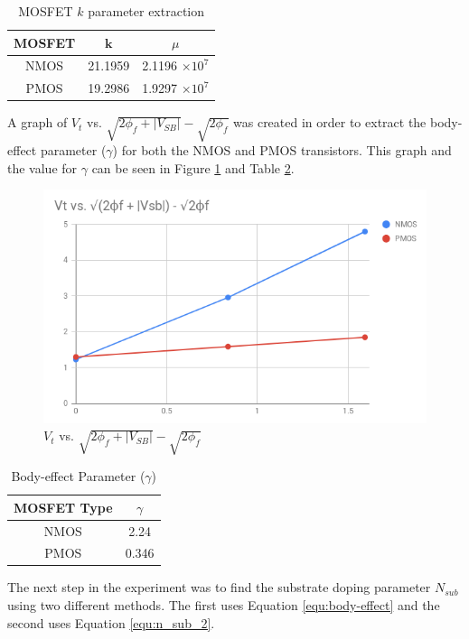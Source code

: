 \documentclass[11pt]{article}
\begin{document}
	\begin{table}[H]
		\centering
		\caption{MOSFET \(k\) parameter extraction}
		\label{table:experimental_body}
		\begin{tabular}{|c|c|c|}
			\hline
			\textbf{MOSFET} & \(\mathbf{k}\) & \(\mu\)\\
			\hline
			NMOS & 21.1959 & 2.1196 \(\times 10^{7}\)\\
			PMOS & 19.2986 & 1.9297 \(\times 10^{7}\)\\
			\hline
		\end{tabular}
	\end{table}
	
	A graph of \(V_t\) vs. \(\sqrt{2\phi_f + |V_{SB}|} - \sqrt{2\phi_f}\) was
	created in order to extract the body-effect parameter (\(\gamma\)) for both
	the NMOS and PMOS transistors. This graph and the value for \(\gamma\) can 
	be seen in Figure \ref{fig:body-effect} and Table \ref{table:body-effect}.

	\begin{figure}[H]
		\centering
		\includegraphics[width=4 in]{vt_vsb_body.png}
		\caption{\(V_t\) vs. \(\sqrt{2\phi_f + |V_{SB}|} - \sqrt{2\phi_f}\)}
		\label{fig:body-effect}
	\end{figure}

	\begin{table}[H]
		\centering
		\caption{Body-effect Parameter (\(\gamma\))}
		\label{table:body-effect}
		\begin{tabular}{|c|c|}
			\hline
			\textbf{MOSFET Type} & \(\gamma\)\\
			\hline
			NMOS & 2.24\\
			PMOS & 0.346\\
			\hline
		\end{tabular}
	\end{table}
	
	The next step in the experiment was to find the substrate doping parameter
	\(N_{sub}\) using two different methods. The first uses Equation
	\ref{equ:body-effect} and the second uses Equation \ref{equ:n_sub_2}.
	
\end{document}
